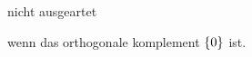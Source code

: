 \documentclass[class=article, crop=false]{standalone}
\begin{document}
\begin{zettel}{nicht ausgeartet}
\begin{definition}
	wenn das orthogonale komplement $\set{0}$ ist.
\end{definition}
\end{zettel}
\end{document}
